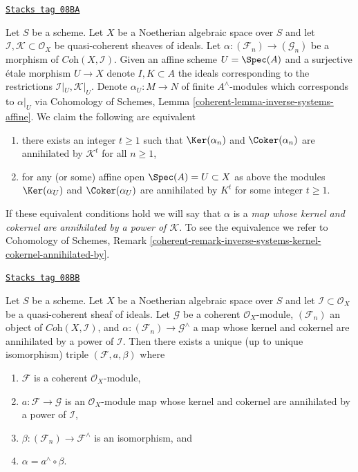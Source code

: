 \begin{remark}
\label{spaces-more-morphisms-remark-inverse-systems-kernel-cokernel-annihilated-by}
\href{https://stacks.math.columbia.edu/tag/08BA}{\texttt{Stacks tag 08BA}}

Let $S$ be a scheme. Let $X$ be a Noetherian algebraic space over $S$ and let
$\mathcal{I}, \mathcal{K} \subset \mathcal{O}_X$ be quasi-coherent sheaves of
ideals. Let $\alpha : (\mathcal{F}_n) \to (\mathcal{G}_n)$ be a morphism of
$\textit{Coh}(X, \mathcal{I})$.
Given an affine scheme $U = \Spec(A)$ and a surjective \'etale morphism
$U \to X$ denote $I, K \subset A$ the ideals corresponding to the restrictions
$\mathcal{I}|_U, \mathcal{K}|_U$. Denote $\alpha_U : M \to N$ of finite
$A^\wedge$-modules which corresponds to $\alpha|_U$ via
Cohomology of Schemes, Lemma \ref{coherent-lemma-inverse-systems-affine}.
We claim the following are equivalent
\begin{enumerate}
\item there exists an integer $t \geq 1$ such that
$\Ker(\alpha_n)$ and $\Coker(\alpha_n)$
are annihilated by $\mathcal{K}^t$ for all $n \geq 1$,
\item for any (or some) affine open $\Spec(A) = U \subset X$ as above
the modules $\Ker(\alpha_U)$ and $\Coker(\alpha_U)$
are annihilated by $K^t$ for some integer $t \geq 1$.
\end{enumerate}
If these equivalent conditions hold we will say that $\alpha$ is a
{\it map whose kernel and cokernel are annihilated by a power of
$\mathcal{K}$}. To see the equivalence we refer to
Cohomology of Schemes, Remark
\ref{coherent-remark-inverse-systems-kernel-cokernel-annihilated-by}.
\end{remark}

\begin{lemma}
\label{spaces-more-morphisms-lemma-existence-easy}
\href{https://stacks.math.columbia.edu/tag/08BB}{\texttt{Stacks tag 08BB}}

Let $S$ be a scheme. Let $X$ be a Noetherian algebraic space over $S$ and let
$\mathcal{I} \subset \mathcal{O}_X$ be a quasi-coherent sheaf of ideals.
Let $\mathcal{G}$ be a coherent $\mathcal{O}_X$-module, $(\mathcal{F}_n)$
an object of $\textit{Coh}(X, \mathcal{I})$, and
$\alpha : (\mathcal{F}_n) \to \mathcal{G}^\wedge$
a map whose kernel and cokernel are annihilated by a power of $\mathcal{I}$.
Then there exists a unique (up to unique isomorphism) triple
$(\mathcal{F}, a, \beta)$ where
\begin{enumerate}
\item $\mathcal{F}$ is a coherent $\mathcal{O}_X$-module,
\item $a : \mathcal{F} \to \mathcal{G}$ is an $\mathcal{O}_X$-module map
whose kernel and cokernel are annihilated by a power of $\mathcal{I}$,
\item $\beta : (\mathcal{F}_n) \to \mathcal{F}^\wedge$ is an isomorphism, and
\item $\alpha = a^\wedge \circ \beta$.
\end{enumerate}
\end{lemma}

